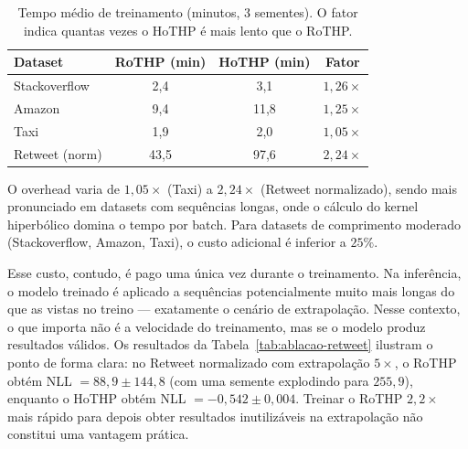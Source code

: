 \begin{table}[h!]
\centering
\caption{Tempo médio de treinamento (minutos, 3 sementes). O fator indica quantas vezes o HoTHP é mais lento que o RoTHP.}
\label{tab:tempo-treino}
\begin{tabular}{lccc}
\toprule
Dataset & RoTHP (min) & HoTHP (min) & Fator \\
\midrule
Stackoverflow  &  2,4 &  3,1 & $1{,}26\times$ \\
Amazon         &  9,4 & 11,8 & $1{,}25\times$ \\
Taxi           &  1,9 &  2,0 & $1{,}05\times$ \\
Retweet (norm) & 43,5 & 97,6 & $2{,}24\times$ \\
\bottomrule
\end{tabular}
\end{table}

O overhead varia de $1{,}05\times$ (Taxi) a $2{,}24\times$ (Retweet normalizado), sendo mais pronunciado em datasets com sequências longas, onde o cálculo do kernel hiperbólico domina o tempo por batch. Para datasets de comprimento moderado (Stackoverflow, Amazon, Taxi), o custo adicional é inferior a $25\%$.

Esse custo, contudo, é pago uma única vez durante o treinamento. Na inferência, o modelo treinado é aplicado a sequências potencialmente muito mais longas do que as vistas no treino --- exatamente o cenário de extrapolação. Nesse contexto, o que importa não é a velocidade do treinamento, mas se o modelo produz resultados válidos. Os resultados da Tabela~\ref{tab:ablacao-retweet} ilustram o ponto de forma clara: no Retweet normalizado com extrapolação $5\times$, o RoTHP obtém NLL $= 88{,}9 \pm 144{,}8$ (com uma semente explodindo para $255{,}9$), enquanto o HoTHP obtém NLL $= -0{,}542 \pm 0{,}004$. Treinar o RoTHP $2{,}2\times$ mais rápido para depois obter resultados inutilizáveis na extrapolação não constitui uma vantagem prática.

